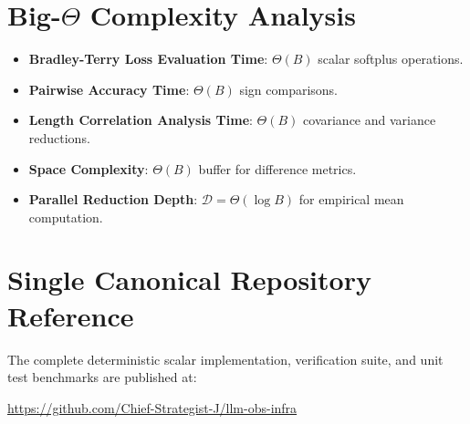 \documentclass[11pt,a4paper]{article}
\theoremstyle{definition}
\begin{document}
\section{Big-$\Theta$ Complexity Analysis}

\begin{itemize}
    \item \textbf{Bradley-Terry Loss Evaluation Time}: $\Theta(B)$ scalar softplus operations.
    \item \textbf{Pairwise Accuracy Time}: $\Theta(B)$ sign comparisons.
    \item \textbf{Length Correlation Analysis Time}: $\Theta(B)$ covariance and variance reductions.
    \item \textbf{Space Complexity}: $\Theta(B)$ buffer for difference metrics.
    \item \textbf{Parallel Reduction Depth}: $\mathcal{D} = \Theta(\log B)$ for empirical mean computation.
\end{itemize}

\section{Single Canonical Repository Reference}

The complete deterministic scalar implementation, verification suite, and unit test benchmarks are published at:
\begin{center}
\url{https://github.com/Chief-Strategist-J/llm-obs-infra}
\end{center}
\end{document}
